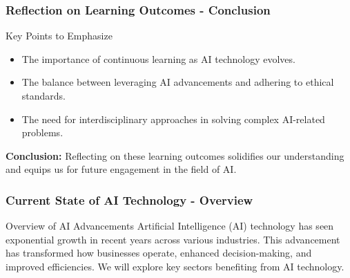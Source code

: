 \documentclass{beamer}
\begin{document}
\begin{frame}
    \frametitle{Reflection on Learning Outcomes - Conclusion}
    \begin{block}{Key Points to Emphasize}
        \begin{itemize}
            \item The importance of continuous learning as AI technology evolves.
            \item The balance between leveraging AI advancements and adhering to ethical standards.
            \item The need for interdisciplinary approaches in solving complex AI-related problems.
        \end{itemize}
    \end{block}
    \textbf{Conclusion:} Reflecting on these learning outcomes solidifies our understanding and equips us for future engagement in the field of AI. 
\end{frame}

\begin{frame}[fragile]
    \frametitle{Current State of AI Technology - Overview}
    \begin{block}{Overview of AI Advancements}
        Artificial Intelligence (AI) technology has seen exponential growth in recent years across various industries. This advancement has transformed how businesses operate, enhanced decision-making, and improved efficiencies. We will explore key sectors benefiting from AI technology.
    \end{block}
\end{frame}
\end{document}
